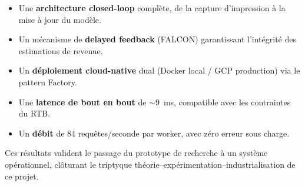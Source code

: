 \begin{itemize}
    \item Une \textbf{architecture closed-loop} complète, de la capture d'impression à la mise à jour du modèle.
    \item Un mécanisme de \textbf{delayed feedback} (FALCON) garantissant l'intégrité des estimations de revenue.
    \item Un \textbf{déploiement cloud-native} dual (Docker local / GCP production) via le pattern Factory.
    \item Une \textbf{latence de bout en bout} de $\sim 9$~ms, compatible avec les contraintes du RTB.
    \item Un \textbf{débit} de 84 requêtes/seconde par worker, avec zéro erreur sous charge.
\end{itemize}

Ces résultats valident le passage du prototype de recherche à un système opérationnel, clôturant le triptyque théorie--expérimentation--industrialisation de ce projet.
